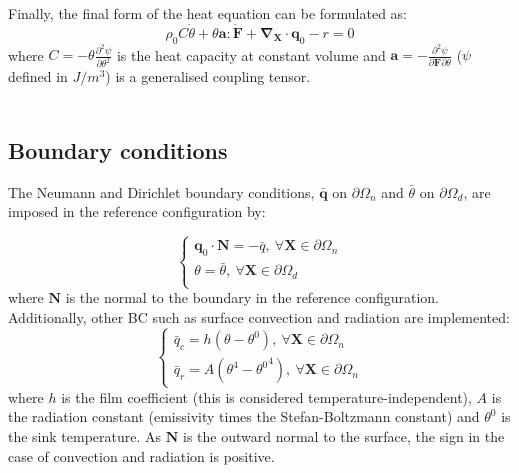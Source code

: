 \documentclass[oneside,11pt,times]{book}
\begin{document}
Finally, the final form of the heat equation can be formulated as:
\begin{equation}
\rho_0C\dot{\theta}+\theta\bm{a}:\dot{\bm{F}}+\bm{\nabla_{X}}\cdot\bm{q}_0-r=0
\label{heateq}
\end{equation}
where $C=-\theta\frac{\partial^2\psi}{\partial \theta^2}$ is the heat capacity at constant volume and $\bm{a}=-\frac{\partial^2\psi}{\partial \bm{F}\partial \theta}$ ($\psi$ defined in $J/m^3$) is a generalised coupling tensor.
\\%
\\


\subsection{Boundary conditions}

The Neumann and Dirichlet boundary conditions, $\bar{\bm{q}}$ on $\partial \Omega_n$ and $\bar{\theta}$ on $\partial \Omega_d$, are imposed in the reference configuration by:

\begin{equation}
\begin{cases}
\bm{q}_0\cdot\bm{N}=-\bar{q}, \: \forall \bm{X} \in \partial \Omega_n\\
\theta=\bar{\theta}, \: \forall \bm{X} \in \partial \Omega_d\\
\end{cases}
\label{boundaryconditions}
\end{equation}
where $\bm{N}$ is the normal to the boundary in the reference configuration.
Additionally, other BC such as surface convection and radiation are implemented:
\begin{equation}
\begin{cases}
\bar{q}_c=h(\theta-\theta^0), \: \forall \bm{X} \in \partial \Omega_n\\
\bar{q}_r=A\left(\theta^4-{\theta^0}^4\right), \: \forall \bm{X} \in \partial \Omega_n
\end{cases}
\label{boundaryconditions2}
\end{equation}
where $h$ is the film coefficient (this is considered temperature-independent), $A$ is the radiation constant (emissivity times the Stefan-Boltzmann constant) and $\theta^0$ is the sink temperature. As $\bm{N}$ is the outward normal to the surface, the sign in the case of convection and radiation is positive.
\end{document}
